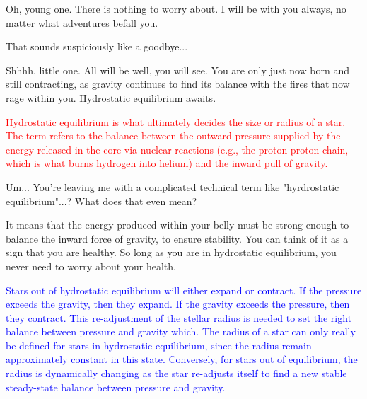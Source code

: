\documentclass[main.tex]{subfiles}
\begin{document}
\par \Pleione Oh, young one.  There is nothing to worry about.  I will be with you always, no matter what adventures befall you.  

\par \Maia That sounds suspiciously like a goodbye...

\par \Pleione Shhhh, little one.  All will be well, you will see.  You are only just now born and still contracting, as gravity continues to find its balance with the fires that now rage within you.  Hydrostatic equilibrium awaits.

\begin{tcolorbox}[sharp corners, colback=red!30, colframe=red!80!blue, title=Hydrostatic Equilibrium]
\par \textcolor{red} {Hydrostatic equilibrium is what ultimately decides the size or radius of a star.  The term refers to the balance between the outward pressure supplied by the energy released in the core via nuclear reactions (e.g., the proton-proton-chain, which is what burns hydrogen into helium) and the inward pull of gravity.}
\end{tcolorbox}

\par \Maia Um... You're leaving me with a complicated technical term like "hyrdrostatic equilibrium"...?  What does that even mean?

\par \Pleione It means that the energy produced within your belly must be strong enough to balance the inward force of gravity, to ensure stability.  You can think of it as a sign that you are healthy.  So long as you are in hydrostatic equilibrium, you never need to worry about your health.

\begin{tcolorbox}[sharp corners, colback=blue!30, colframe=blue!80!blue, title=What determines the radius of a star?]
\par \textcolor{blue} {Stars out of hydrostatic equilibrium will either expand or contract.  If the pressure exceeds the gravity, then they expand.  If the gravity exceeds the pressure, then they contract.  This re-adjustment of the stellar radius is needed to set the right balance between pressure and gravity which.  The radius of a star can only really be defined for stars in hydrostatic equilibrium, since the radius remain approximately constant in this state.  Conversely, for stars out of equilibrium, the radius is dynamically changing as the star re-adjusts itself to find a new stable steady-state balance between pressure and gravity.}
\end{tcolorbox}
\end{document}
